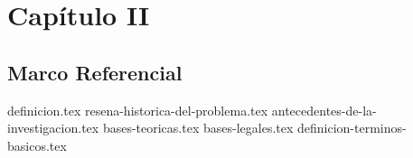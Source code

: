 \chapter{Capítulo II}
\section{Marco Referencial}
{definicion.tex}
{resena-historica-del-problema.tex}
{antecedentes-de-la-investigacion.tex}
{bases-teoricas.tex}
{bases-legales.tex}
{definicion-terminos-basicos.tex}
